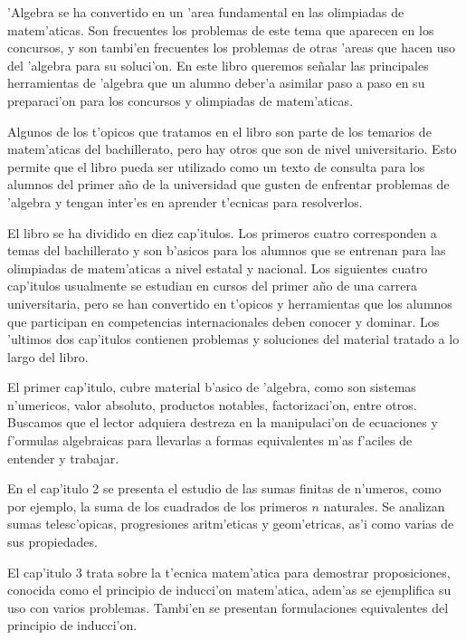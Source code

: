 'Algebra se ha convertido en un 'area fundamental en las olimpiadas de 
mate\-m'a\-ticas. Son frecuentes los problemas de este tema que aparecen en los concursos,
y son tambi'en  frecuentes los problemas de otras 'areas que hacen uso del 'algebra para 
su soluci'on. En este libro queremos se\~nalar las principales herramientas de 'algebra 
que un alumno deber'a asimilar paso a paso en su preparaci'on para los concursos y olimpiadas 
de matem'aticas. 

Algunos de los t'opicos que tratamos en el libro son parte de los temarios de matem'aticas 
del bachillerato, pero hay otros que son de nivel universitario. Esto permite que el libro pueda 
ser utilizado como un texto de consulta para los alumnos del primer a\~no de la 
universidad  que gusten de enfrentar  problemas de 'algebra y tengan inter'es en aprender t'ecnicas para resolverlos.

El libro se ha dividido en diez cap'itulos. Los primeros cuatro corresponden a temas del 
bachillerato y son b'asicos para los alumnos que se entrenan para las olimpiadas de matem'aticas  
a nivel estatal y nacional. Los siguientes cuatro cap'itulos  usualmente se estudian 
en cursos del primer a\~no de una carrera universitaria, pero se han convertido en t'opicos y 
herramientas  que los alumnos que participan en 
competencias internacionales deben conocer y dominar.  Los 'ultimos dos cap'itulos contienen problemas y soluciones del material tratado a lo largo del libro.  



El primer cap'itulo,  cubre material b'asico de 'algebra, como son  sistemas n'umericos,  valor 
absoluto, productos notables, factorizaci'on, entre otros. Buscamos que el lector  adquiera 
destreza en la manipulaci'on de ecuaciones y f'ormulas algebraicas para llevarlas a formas 
equivalentes m'as f'aciles de entender y trabajar.

En el cap'itulo 2 se presenta el estudio de las sumas finitas de n'umeros, como por ejemplo, la 
suma de los cuadrados de los primeros $n$ naturales. Se analizan  sumas
telesc'opicas, progresiones aritm'eticas y geom'etricas, as'i como  varias de sus 
propiedades.

El cap'itulo 3  trata sobre la t'ecnica matem'atica para demostrar 
proposiciones, conocida como 
el principio de inducci'on matem'atica, adem'as se ejemplifica su uso con 
varios problemas. Tambi'en  se presentan  formulaciones equivalentes del 
principio de inducci'on.

\newpage

